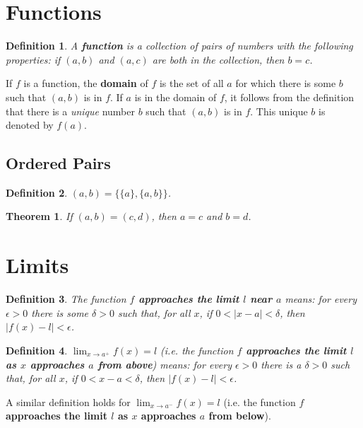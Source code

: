 \documentclass{article}
\numberwithin{corollary}{subsection}
\numberwithin{definition}{subsection}
\newtheorem*{definition*}{Definition}
\numberwithin{lemma}{subsection}
\newtheorem{theorem}{Theorem}
\numberwithin{theorem}{subsection}
\begin{document}
\setcounter{section}{2}
\section{Functions}

\begin{definition*}
  A \textbf{function} is a collection of pairs of numbers with the following
  properties: if $(a, b)$ and $(a, c)$ are both in the collection, then $b =
  c$.
\end{definition*}

If $f$ is a function, the \textbf{domain} of $f$ is the set of all $a$ for
which there is some $b$ such that $(a, b)$ is in $f$. If $a$ is in the domain
of $f$, it follows from the definition that there is a \emph{unique} number $b$
such that $(a, b)$ is in $f$. This unique $b$ is denoted by $f(a)$.

\subsection{Ordered Pairs}

\begin{definition*}
  $(a, b) = \{\{a\}, \{a, b\}\}$.
\end{definition*}

\begin{theorem}
  If $(a, b) = (c, d)$, then $a = c$ and $b = d$.
\end{theorem}

\setcounter{section}{4}
\section{Limits}

\begin{definition*}
  The function \textbf{$f$ approaches the limit $l$ near $a$} means: for every
  $\epsilon > 0$ there is some $\delta > 0$ such that, for all $x$, if $0 < |x
  - a| < \delta$, then $|f(x) - l| < \epsilon$.
\end{definition*}

\begin{definition*}
  $\lim_{x \to a^+} f(x) = l$ (i.e. the function \textbf{$f$ approaches the
  limit $l$ as $x$ approaches $a$ from above}) means: for every $\epsilon > 0$
  there is a $\delta > 0$ such that, for all $x$, if $0 < x - a < \delta$, then
  $|f(x) - l| < \epsilon$.
\end{definition*}

A similar definition holds for $\lim_{x \to a^-} f(x) = l$ (i.e. the function
\textbf{$f$ approaches the limit $l$ as $x$ approaches $a$ from below}).
\end{document}
